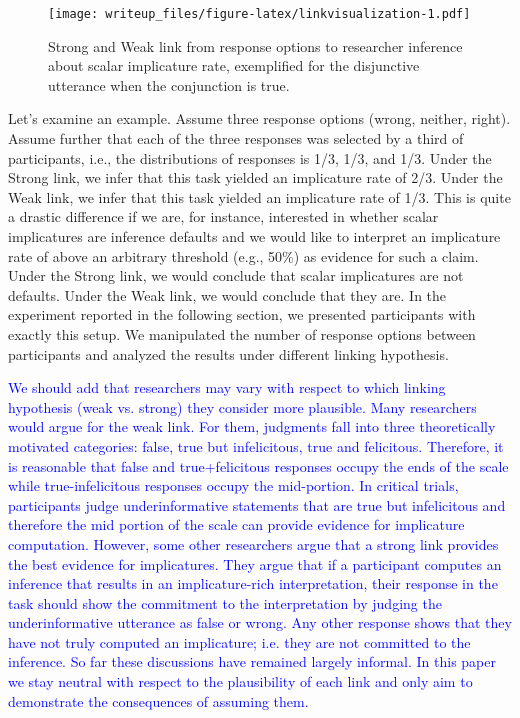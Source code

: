 \documentclass[man]{apa6}
\newcommand{\change}[1]{\textcolor{Blue}{#1}}
\theoremstyle{definition}
\theoremstyle{definition}
\theoremstyle{definition}
\theoremstyle{remark}
\begin{document}
\begin{figure}
\centering
\texttt{[image: writeup\_files/figure-latex/linkvisualization-1.pdf]}
\caption{\label{fig:linkvisualization}Strong and Weak link from response
options to researcher inference about scalar implicature rate,
exemplified for the disjunctive utterance when the conjunction is true.}
\end{figure}

Let's examine an example. Assume three response options (wrong, neither,
right). Assume further that each of the three responses was selected by
a third of participants, i.e., the distributions of responses is 1/3,
1/3, and 1/3. Under the Strong link, we infer that this task yielded an
implicature rate of 2/3. Under the Weak link, we infer that this task
yielded an implicature rate of 1/3. This is quite a drastic difference
if we are, for instance, interested in whether scalar implicatures are
inference defaults and we would like to interpret an implicature rate of
above an arbitrary threshold (e.g., 50\%) as evidence for such a claim.
Under the Strong link, we would conclude that scalar implicatures are
not defaults. Under the Weak link, we would conclude that they are. In
the experiment reported in the following section, we presented
participants with exactly this setup. We manipulated the number of
response options between participants and analyzed the results under
different linking hypothesis.

\change{We should add that researchers may vary with respect to which linking hypothesis (weak vs. strong) they consider more plausible. Many researchers would argue for the weak link. For them, judgments fall into three theoretically motivated categories: false, true but infelicitous, true and felicitous. Therefore, it is reasonable that false and true+felicitous responses occupy the ends of the scale while true-infelicitous responses occupy the mid-portion. In critical trials, participants judge underinformative statements that are true but infelicitous and therefore the mid portion of the scale can provide evidence for implicature computation. However, some other researchers argue that a strong link provides the best evidence for implicatures. They argue that if a participant computes an inference that results in an implicature-rich interpretation, their response in the task should show the commitment to the interpretation by judging the underinformative utterance as false or wrong. Any other response shows that they have not truly computed an implicature; i.e. they are not committed to the inference. So far these discussions have remained largely informal. In this paper we stay neutral with respect to the plausibility of each link and only aim to demonstrate the consequences of assuming them.}
\end{document}

